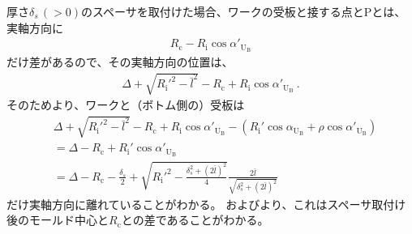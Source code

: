 \clearpage
\index{\yomiSpacerThickness@\nameSpacerThickness}厚さ$\delta_s\,(>0)$のスペーサを取付けた場合、ワークの受板と接する点と\TableCenter Pとは、実軸方向に
\begin{align*}
  R_\mathrm c-R_\mathrm i\cos\alpha'_{\mathrm U_\mathrm B}
\end{align*}
だけ差があるので、その実軸方向の位置は、
\begin{align*}
  \Delta+\sqrt{R_\mathrm i'^2-\bar l^2}-R_\mathrm c+R_\mathrm i\cos\alpha'_{\mathrm U_\mathrm B}\ .
\end{align*}
そのためより、ワークと（ボトム側の）受板は
\begin{align*}
  &  \Delta+\sqrt{R_\mathrm i'^2-\bar l^2}-R_\mathrm c+R_\mathrm i\cos\alpha'_{\mathrm U_\mathrm B}
     -\left(R_\mathrm i'\cos\alpha_{\mathrm U_\mathrm B}+\rho\cos\alpha'_{\mathrm U_\mathrm B}\right)\\
  &= \Delta-R_\mathrm c+R_\mathrm i'\cos\alpha'_{\mathrm U_\mathrm B}\\
  &= \Delta-R_\mathrm c
     -\frac{\delta_s}2+\sqrt{R_\mathrm i'^2-\frac{\delta_s^2+(2\bar l)^2}4}\frac{2\bar l}{\sqrt{\delta_s^2+(2\bar l)^2}}
\end{align*}
だけ実軸方向に離れていることがわかる。
およびより、これはスペーサ取付け後のモールド中心と\CenterCurvature$R_\mathrm c$との差であることがわかる。
